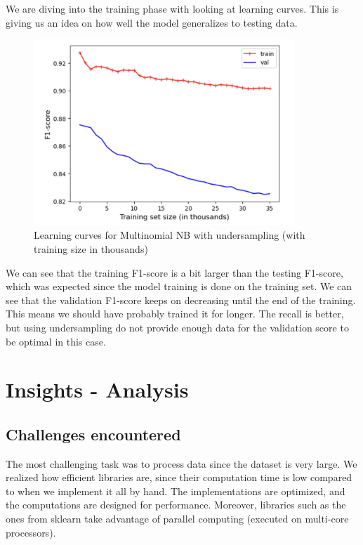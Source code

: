 \documentclass{article}
\begin{document}
We are diving into the training phase with looking at learning curves. This is giving us an idea on how well the model generalizes to testing data.

\begin{figure}[H]
  \centering
  \includegraphics[height=7cm]{nb_start_learning_curves.png}
  \caption{Learning curves for Multinomial NB with undersampling (with training size in thousands)}
  \label{fig:image_label}
\end{figure}

We can see that the training F1-score is a bit larger than the testing F1-score, which was expected since the model training is done on the training set. We can see that the validation F1-score keeps on decreasing until the end of the training. This means we should have probably trained it for longer. The recall is better, but using undersampling do not provide enough data for the validation score to be optimal in this case.

\section{Insights - Analysis}

\subsection{Challenges encountered}

The most challenging task was to process data since the dataset is very large. We realized how efficient libraries are, since their computation time is low compared to when we implement it all by hand.
The implementations are optimized, and the computations are designed for performance. Moreover, libraries such as the ones from sklearn take advantage of parallel computing (executed on multi-core processors). 
\end{document}
